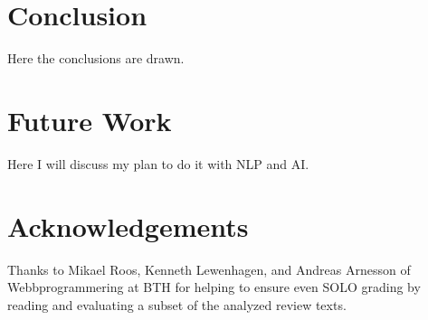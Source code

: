 \documentclass[twoside,twocolumn,a4paper,11pt,english]{article}
\begin{document}

\section{Conclusion}

Here the conclusions are drawn.




\section{Future Work}


Here I will discuss my plan to do it with NLP and AI.




\section{Acknowledgements}

Thanks to Mikael Roos, Kenneth Lewenhagen, and Andreas Arnesson of Webbprogrammering at BTH for helping to ensure even SOLO grading by reading and evaluating a subset of the analyzed review texts.







\end{document}
